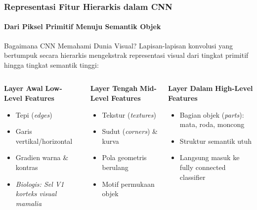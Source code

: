 \documentclass[t,aspectratio=169,xcolor=dvipsnames]{beamer}
\begin{document}
\begin{frame}
    \frametitle{Representasi Fitur Hierarkis dalam CNN}
    \framesubtitle{Dari Piksel Primitif Menuju Semantik Objek}
    \small

    \begin{block}{Bagaimana CNN Memahami Dunia Visual?}
        Lapisan-lapisan konvolusi yang bertumpuk secara hierarkis mengekstrak representasi visual dari tingkat primitif hingga tingkat semantik tinggi:
    \end{block}

    \begin{columns}[t]
        \begin{exampleblock}{\textbf{Layer Awal}}
            \textbf{Low-Level Features}
            \begin{itemize}
                \footnotesize
                \item Tepi (\textit{edges})
                \item Garis vertikal/horizontal
                \item Gradien warna \& kontras
                \item \textit{Biologis: Sel V1 korteks visual mamalia}
            \end{itemize}
        \end{exampleblock}

        \begin{block}{\textbf{Layer Tengah}}
            \textbf{Mid-Level Features}
            \begin{itemize}
                \footnotesize
                \item Tekstur (\textit{textures})
                \item Sudut (\textit{corners}) \& kurva
                \item Pola geometris berulang
                \item Motif permukaan objek
            \end{itemize}
        \end{block}

        \begin{alertblock}{\textbf{Layer Dalam}}
            \textbf{High-Level Features}
            \begin{itemize}
                \footnotesize
                \item Bagian objek (\textit{parts}): mata, roda, moncong
                \item Struktur semantik utuh
                \item Langsung masuk ke fully connected classifier
            \end{itemize}
        \end{alertblock}
    \end{columns}
\end{frame}
\end{document}
